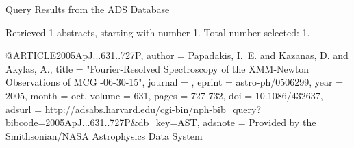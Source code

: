 Query Results from the ADS Database


Retrieved 1 abstracts, starting with number 1.  Total number selected: 1.

@ARTICLE{2005ApJ...631..727P,
   author = {{Papadakis}, I.~E. and {Kazanas}, D. and {Akylas}, A.},
    title = "{Fourier-Resolved Spectroscopy of the XMM-Newton Observations of MCG -06-30-15}",
  journal = {\apj},
   eprint = {astro-ph/0506299},
     year = 2005,
    month = oct,
   volume = 631,
    pages = {727-732},
      doi = {10.1086/432637},
   adsurl = {http://adsabs.harvard.edu/cgi-bin/nph-bib_query?bibcode=2005ApJ...631..727P&db_key=AST},
  adsnote = {Provided by the Smithsonian/NASA Astrophysics Data System}
}


